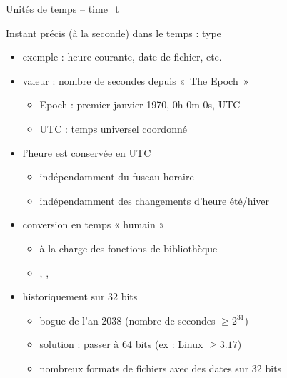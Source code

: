 \begin {frame} {Unités de temps -- time\_t}

    Instant précis (à la seconde) dans le temps : type 

    \begin {itemize}
	\item exemple : heure courante, date de fichier, etc.
	\item valeur : nombre de secondes depuis «~The Epoch~»
	    \begin {itemize}
		\item Epoch : premier janvier 1970, 0h 0m 0s, UTC
		\item UTC : temps universel coordonné
	    \end {itemize}

	\item l'heure est conservée en UTC
	    \begin {itemize}
		\item indépendamment du fuseau horaire
		\item indépendamment des changements d'heure été/hiver
	    \end {itemize}

	\item conversion en temps « humain »
	    \begin {itemize}
		\item à la charge des fonctions de bibliothèque
		\item {}, , 
	    \end {itemize}

	\item {} historiquement sur 32 bits
	    \begin {itemize}
		\item bogue de l'an 2038 (nombre de secondes $\geq 2^{31}$)
		\item solution : passer à 64 bits (ex : Linux $\geq 3.17$)
		\item nombreux formats de fichiers avec des dates
		    sur 32 bits
	    \end {itemize}
    \end {itemize}
\end {frame}

